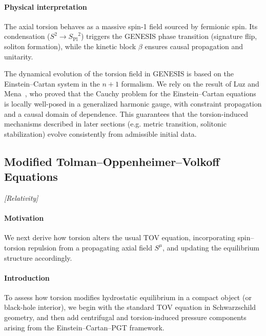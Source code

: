 \documentclass{article}
\newcommand{\Splanck}{\ensuremath{S_{\mathrm{Pl}}}}
\newcommand{\grtag}{\textcolor{blue!40!black}{\textit{[Relativity]}}}
\begin{document}
\paragraph{Physical interpretation}
The axial torsion behaves as a massive spin‑1 field sourced by fermionic spin.
Its condensation (\(S^2\!\to\!\Splanck^{2}\)) triggers
the GENESIS phase transition (signature flip, soliton formation),
while the kinetic block \(\beta\) ensures causal propagation and unitarity.

\medskip
\begin{center}
\end{center}


The dynamical evolution of the torsion field in GENESIS is based on the Einstein–Cartan system in the \( n + 1 \) formalism.
We rely on the result of Luz and Mena~\cite{LuzMena2025}, who proved that the Cauchy problem for the Einstein–Cartan equations is locally well-posed in a generalized harmonic gauge, with constraint propagation and a causal domain of dependence.
This guarantees that the torsion-induced mechanisms described in later sections (e.g. metric transition, solitonic stabilization) evolve consistently from admissible initial data.




\subsection{Modified Tolman--Oppenheimer--Volkoff Equations}
\label{sec:modified-tov}
\grtag

\paragraph{Motivation}
We next derive how torsion alters the usual TOV equation, incorporating spin–torsion repulsion from a propagating axial field $S^\mu$, and updating the equilibrium structure accordingly.

\paragraph{Introduction}
To assess how torsion modifies hydrostatic equilibrium in a compact object (or black-hole interior), we begin with the standard TOV equation in Schwarzschild geometry, and then add centrifugal and torsion-induced pressure components arising from the Einstein–Cartan–PGT framework.
\end{document}
